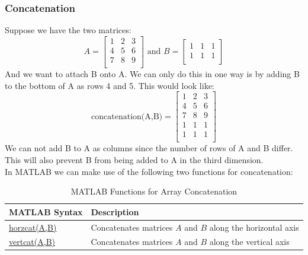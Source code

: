 \documentclass[../MATLAB_Primer.tex]{subfiles}
\begin{document}
\subsubsection{Concatenation}
Suppose we have the two matrices:
\[
A = 
\begin{bmatrix}
1 & 2 & 3\\
4 & 5 & 6\\
7 & 8 & 9\\
\end{bmatrix}
\text{    and    }
B = 
\begin{bmatrix}
1 & 1 & 1\\
1 & 1 & 1\\
\end{bmatrix}
\]
And we want to attach B onto A. We can only do this in one way is by adding B to the bottom of A as rows 4 and 5. This would look like:
\[
\text{concatenation(A,B)} = 
\begin{bmatrix}
1 & 2 & 3\\
4 & 5 & 6\\
7 & 8 & 9\\
1 & 1 & 1\\
1 & 1 & 1\\
\end{bmatrix}
\]
We can not add B to A as columns since the number of rows of A and B differ. This will also prevent B from being added to A in the third dimension.\\

In MATLAB we can make use of the following two functions for concatenation:

\begin{table}[H]
\caption{MATLAB Functions for Array Concatenation}
    \begin{center}
        \begin{tabular}{| C{3cm} | m{12cm}|}
            \hline
            \textbf{MATLAB Syntax} & \textbf{Description}\\
            
            \hline
            \href{https://www.mathworks.com/help/matlab/ref/horzcat.html}{\color{blue}horzcat(A,B)} & Concatenates matrices $A$ and $B$ along the horizontal axis\\
            \hline
            
            \href{https://www.mathworks.com/help/matlab/ref/vertcat.html}{\color{blue}vertcat(A,B)} & Concatenates matrices $A$ and $B$ along the vertical axis\\
            \hline
        \end{tabular}
        \label{tab:more_array_functions}
    \end{center}
\end{table}
\end{document}
